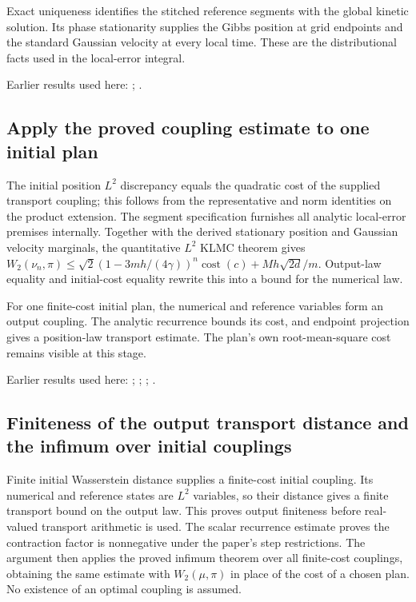 \documentclass[11pt,a4paper]{report}
\begin{document}
Exact uniqueness identifies the stitched reference segments with the global kinetic solution. Its phase stationarity supplies the Gibbs position at grid endpoints and the standard Gaussian velocity at every local time. These are the distributional facts used in the local-error integral.



Earlier results used here: \cite[Section~3.17.1]{LangevinLean2026ULASC}; \cite[Section~3.22.6]{LangevinLean2026ULASC}.
\subsection{\texorpdfstring{Apply the proved coupling estimate to one initial plan}{Apply the proved coupling estimate to one initial plan}}
\label{report-step-KineticLangevin-CanonicalKLMCBound-lean-3}


The initial position \(L^{2}\) discrepancy equals the quadratic cost of the supplied transport coupling; this follows from the representative and norm identities on the product extension. The segment specification furnishes all analytic local-error premises internally. Together with the derived stationary position and Gaussian velocity marginals, the quantitative \(L^{2}\) KLMC theorem gives \(W_2(\nu_n,\pi)\le\sqrt2(1-3mh/(4\gamma))^n\operatorname{cost}(c)+Mh\sqrt{2d}/m\). Output-law equality and initial-cost equality rewrite this into a bound for the numerical law.



For one finite-cost initial plan, the numerical and reference variables form an output coupling. The analytic recurrence bounds its cost, and endpoint projection gives a position-law transport estimate. The plan’s own root-mean-square cost remains visible at this stage.



Earlier results used here: \cite[Section~3.17.1]{LangevinLean2026ULASC}; \cite[Section~3.17.2]{LangevinLean2026ULASC}; \cite[Section~3.17.4]{LangevinLean2026ULASC}; \cite[Section~3.22.23]{LangevinLean2026ULASC}.
\subsection{\texorpdfstring{Finiteness of the output transport distance and the infimum over initial couplings}{Finiteness of the output transport distance and the infimum over initial couplings}}
\label{report-step-KineticLangevin-CanonicalKLMCBound-lean-4}


Finite initial Wasserstein distance supplies a finite-cost initial coupling. Its numerical and reference states are \(L^{2}\) variables, so their distance gives a finite transport bound on the output law. This proves output finiteness before real-valued transport arithmetic is used. The scalar recurrence estimate proves the contraction factor is nonnegative under the paper's step restrictions. The argument then applies the proved infimum theorem over all finite-cost couplings, obtaining the same estimate with \(W_2(\mu,\pi)\) in place of the cost of a chosen plan. No existence of an optimal coupling is assumed.
\end{document}
